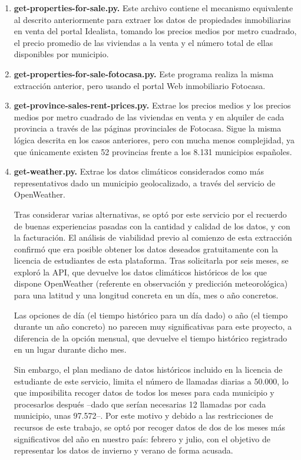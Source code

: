 \begin{enumerate}
    \item \textbf{get-properties-for-sale.py.} Este archivo contiene el mecanismo equivalente al descrito anteriormente para extraer los datos de propiedades inmobiliarias en venta del portal Idealista, tomando los precios medios por metro cuadrado, el precio promedio de las viviendas a la venta y el número total de ellas disponibles por municipio.

    \item \textbf{get-properties-for-sale-fotocasa.py.} Este programa realiza la misma extracción anterior, pero usando el portal Web inmobiliario Fotocasa.

    \item \textbf{get-province-sales-rent-prices.py.} Extrae los precios medios y los precios medios por metro cuadrado de las viviendas en venta y en alquiler de cada provincia a través de las páginas provinciales de Fotocasa. Sigue la misma lógica descrita en los casos anteriores, pero con mucha menos complejidad, ya que únicamente existen 52 provincias frente a los 8.131 municipios españoles.

    \item \textbf{get-weather.py.} Extrae los datos climáticos considerados como más representativos dado un municipio geolocalizado, a través del servicio de OpenWeather.

    Tras considerar varias alternativas, se optó por este servicio por el recuerdo de buenas experiencias pasadas con la cantidad y calidad de los datos, y con la facturación. El análisis de viabilidad previo al comienzo de esta extracción confirmó que era posible obtener los datos deseados gratuitamente con la licencia de estudiantes de esta plataforma. Tras solicitarla por seis meses, se exploró la API, que devuelve los datos climáticos históricos de los que dispone OpenWeather (referente en  observación y predicción meteorológica) para una latitud y una longitud concreta en un día, mes o año concretos.
    
    Las opciones de día (el tiempo histórico para un día dado) o año (el tiempo durante un año concreto) no parecen muy significativas para este proyecto, a diferencia de la opción mensual, que devuelve el tiempo histórico registrado en un lugar durante dicho mes.
    
    Sin embargo, el plan mediano de datos históricos incluido en la licencia de estudiante de este servicio, limita el número de llamadas diarias a 50.000, lo que imposibilita recoger datos de todos los meses para cada municipio y procesarlos después –dado que serían necesarias 12 llamadas por cada municipio, unas 97.572–. Por este motivo y debido a las restricciones de recursos de este trabajo, se optó por recoger datos de dos de los meses más significativos del año en nuestro país: febrero y julio, con el objetivo de representar los datos de invierno y verano de forma acusada.
    

\end{enumerate}
